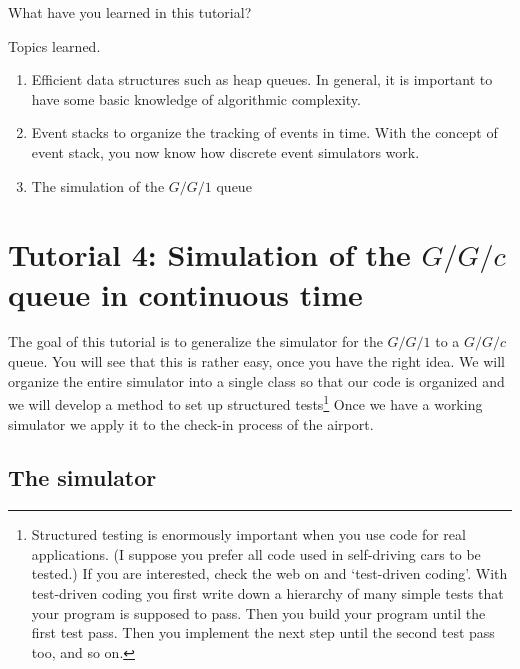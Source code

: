 \begin{exercise}
  What have you learned in this tutorial?
  \begin{solution}
    Topics learned.
    \begin{enumerate}
    \item Efficient data structures such as heap queues. In general, it is important to have some basic knowledge of algorithmic complexity. 
    \item Event stacks to organize the tracking of events in time. With the concept of event stack, you now know how discrete event simulators work. 
    \item The simulation of the $G/G/1$ queue
    \end{enumerate}
  \end{solution}
\end{exercise}


\clearpage


\section{Tutorial 4: Simulation of the $G/G/c$ queue in continuous time}
\label{sec:ggc-continuous-time}

The goal of this tutorial is to  generalize the simulator for the $G/G/1$ to a $G/G/c$ queue. You will see that this is rather easy, once you have the right idea. We will organize the entire simulator into a single class so that our code is organized and we will develop a method to set up structured  tests\footnote{Structured testing is enormously important when you use code for real applications. (I suppose you prefer all code used in self-driving cars to be tested.)  If you are interested, check the web on   and `test-driven coding'. With test-driven coding you first write down a hierarchy of  many simple tests that your program is supposed to pass.  Then you build your program until the first test pass. Then you implement the next step until the second test pass too, and so on.} Once we have a working simulator we apply it to the check-in process of the airport. 



\subsection{The simulator}
\label{sec:simulator}

